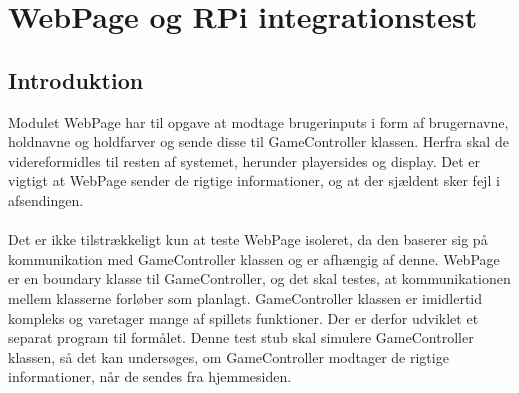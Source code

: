 \documentclass[Integrationstest/Integrationstest_main.tex]{subfiles}
\begin{document}
\lstset{style=customc}

\section{WebPage og RPi integrationstest}
\subsection{Introduktion}
Modulet WebPage har til opgave at modtage brugerinputs i form af brugernavne, holdnavne og holdfarver og sende disse til GameController klassen. Herfra skal de videreformidles til resten af systemet, herunder playersides og display. Det er vigtigt at WebPage sender de rigtige informationer, og at der sjældent sker fejl i afsendingen. \\\\Det er ikke tilstrækkeligt kun at teste WebPage isoleret, da den baserer sig på kommunikation med GameController klassen og er afhængig af denne. WebPage er en boundary klasse til GameController, og det skal testes, at kommunikationen mellem klasserne forløber som planlagt. GameController klassen er imidlertid kompleks og varetager  mange af spillets funktioner. Der er derfor udviklet et separat program til formålet. Denne test stub skal simulere GameController klassen, så det kan undersøges, om GameController modtager de rigtige informationer, når de sendes fra hjemmesiden. 
\end{document}
